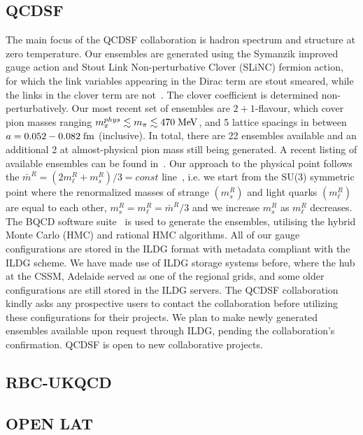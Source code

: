 \documentclass[a4paper,11pt]{article}
\begin{document}
\subsection{QCDSF}
The main focus of the QCDSF collaboration is hadron spectrum and
structure at zero temperature.
%
%
Our ensembles are generated using the Symanzik improved gauge action
and Stout Link Non-perturbative Clover (SLiNC) fermion action, for
which the link variables appearing in the Dirac term are stout
smeared, while the links in the clover term are
not~\cite{Cundy:2009yy}. The clover coefficient is determined
non-perturbatively.
%
Our most recent set of ensembles are $2+1$-flavour, which cover pion
masses ranging $m_\pi^{phys} \lesssim m_\pi \lesssim 470 \; {\rm
  MeV}$, and 5 lattice spacings in between $a = 0.052 - 0.082 \; {\rm
  fm}$ (inclusive).
%
In total, there are 22 ensembles available and an additional 2 at
almost-physical pion mass still being generated. A recent listing of
available ensembles can be found in~\cite{QCDSFUKQCDCSSM:2023qlx}.
%
Our approach to the physical point follows the $\bar m^R = (2m_\ell^R
+ m_s^R)/3 = const$ line~\cite{Bietenholz:2011qq}, i.e. we start from
the SU(3) symmetric point where the renormalized masses of strange
$(m_s^R)$ and light quarks $(m_\ell^R)$ are equal to each other,
$m_s^R = m_\ell^R = \bar m^R/3$ and we increase $m_s^R$ as $m_\ell^R$
decreases.
%
%
The BQCD software suite~\cite{Haar:2017ubh} is used to generate the
ensembles, utilising the hybrid Monte Carlo (HMC) and rational HMC
algorithms.
%
%
All of our gauge configurations are stored in the ILDG format with
metadata compliant with the ILDG scheme. We have made use of ILDG
storage systems before, where the hub at the CSSM, Adelaide served as
one of the regional grids, and some older configurations are still
stored in the ILDG servers.
%
%
The QCDSF collaboration kindly asks any prospective users to contact
the collaboration before utilizing these configurations for their
projects. We plan to make newly generated ensembles available upon
request through ILDG, pending the collaboration's confirmation. QCDSF
is open to new collaborative projects.


\subsection{RBC-UKQCD}

\subsection{OPEN LAT}
\newpage
\end{document}
